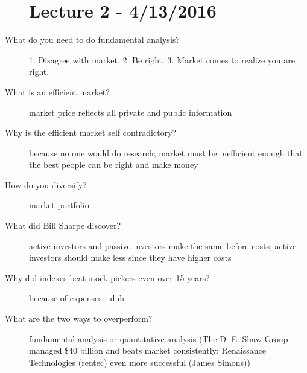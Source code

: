 \documentclass[11pt]{article}
\begin{document}
\begin{description}
\section{Lecture 2 - 4/13/2016}
\item[What do you need to do fundamental analysis?]
  1. Disagree with market.
  2. Be right.
  3. Market comes to realize you are right.
\item[What is an efficient market?]
  market price reflects all private and public information
\item[Why is the efficient market self contradictory?]
  because no one would do research;
  market must be inefficient enough that the best people can be right and make money
\item[How do you diversify?]
  market portfolio
\item[What did Bill Sharpe discover?]
  active investors and passive investors make the same before costs;
  active investors should make less since they have higher costs
\item[Why did indexes beat stock pickers even over 15 years?]
  because of expenses - duh
\item[What are the two ways to overperform?]
  fundamental analysis or quantitative analysis (The D. E. Shaw  Group managed \$40 billion and beats market consistently; Renaissance Technologies (rentec) even more successful (James Simons))

\end{description}
\end{document}
